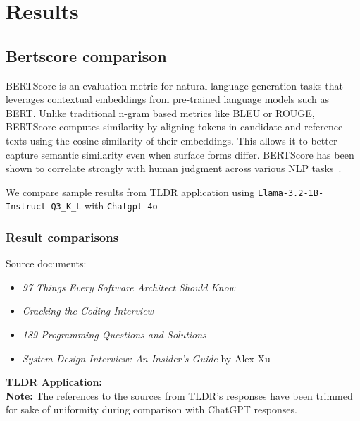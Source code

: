 
\chapter{Results}
\label{ch:Results}



\section{Bertscore comparison}
\label{BertscoreComparison}

BERTScore is an evaluation metric for natural language generation tasks that leverages contextual embeddings from pre-trained language models such as BERT. Unlike traditional n-gram based metrics like BLEU or ROUGE, BERTScore computes similarity by aligning tokens in candidate and reference texts using the cosine similarity of their embeddings. This allows it to better capture semantic similarity even when surface forms differ. BERTScore has been shown to correlate strongly with human judgment across various NLP tasks~\cite{zhang2020bertscore}.


We compare sample results from TLDR application using \texttt{Llama-3.2-1B-Instruct-Q3\_K\_L} with \texttt{Chatgpt 4o}

\subsection{Result comparisons}
\label{subsec:Result comparisons}
Source documents:
\begin{itemize}
    \item \textit{97 Things Every Software Architect Should Know}
    \item \textit{Cracking the Coding Interview}
    \item \textit{189 Programming Questions and Solutions}
    \item \textit{System Design Interview: An Insider’s Guide} by Alex Xu
\end{itemize}
\textbf{TLDR Application:}
\\ \textbf{Note:} The references to the sources from TLDR's responses have been trimmed for sake of uniformity during comparison with ChatGPT responses.

